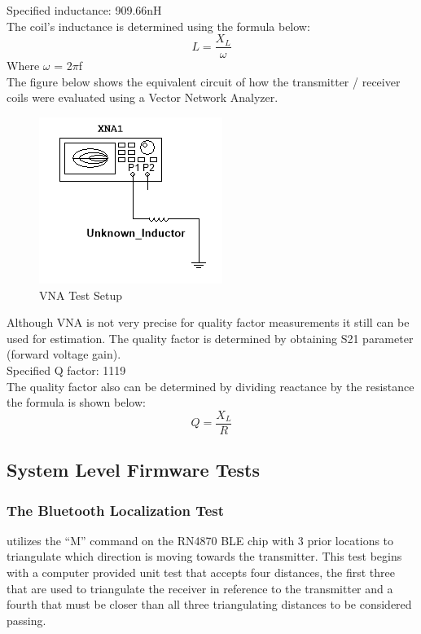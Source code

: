 \documentclass[12pt]{article}
\begin{document}
\noindent
Specified inductance: 909.66nH\\

\noindent
The coil's inductance is determined using the formula below:
\begin{equation}
L = \frac{X_L}{\omega}
\end{equation}
\noindent
Where $\omega$ = 2$\pi$f\\

\noindent
The figure below shows the equivalent circuit of how the transmitter / receiver coils were evaluated using a Vector Network Analyzer.
\hfill
\begin{figure}[h!]
\centering
\includegraphics[width=0.5\linewidth]{RX_SUBSYSTEM_COIL_TERMINALS.PNG}
\caption{VNA Test Setup}
\end{figure}

\pagebreak

\noindent
Although VNA is not very precise for quality factor measurements it still can be used for estimation. The quality factor is determined by obtaining S21 parameter (forward voltage gain).\\

\noindent
Specified Q factor: 1119\\
 
 \noindent
The quality factor also can be determined by dividing reactance by the resistance the formula is shown below:
\begin{equation}
Q = \frac{X_L}{R}
\end{equation}

\subsection{System Level Firmware Tests}

\subsubsection*{The Bluetooth Localization Test} utilizes the “M” command on the RN4870 BLE chip with 3 prior locations to triangulate which direction is moving towards the transmitter.  This test begins with a computer provided unit test that accepts four distances, the first three that are used to triangulate the receiver in reference to the transmitter and a fourth that must be closer than all three triangulating distances to be considered passing.
\hfill 
\pagebreak
\end{document}

